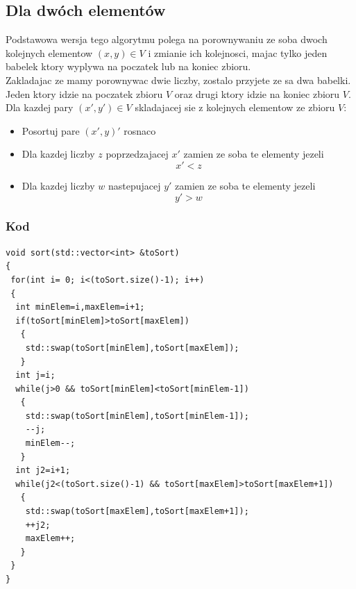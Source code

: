 \subsection{Dla dwóch elementów}
Podstawowa wersja tego algorytmu polega na porownywaniu ze soba dwoch kolejnych elementow $(x,y) \in V$ i zmianie ich kolejnosci, majac tylko jeden babelek ktory wyplywa na poczatek lub na koniec zbioru. \\
Zakladajac ze mamy porownywac dwie liczby, zostalo przyjete ze sa dwa babelki. Jeden ktory idzie na poczatek zbioru  $V$ oraz drugi ktory idzie na koniec zbioru $V$. \\
Dla kazdej pary $(x',y') \in V$ skladajacej sie z kolejnych elementow ze zbioru $V$:
\begin{itemize} 
\item Posortuj pare $(x',y)'$ rosnaco
\item Dla kazdej liczby $z$ poprzedzajacej $x'$ zamien ze soba te elementy jezeli\begin{equation*}x' < z\end{equation*} 
\item  Dla kazdej liczby $w$ nastepujacej $y'$ zamien ze soba te elementy jezeli \begin{equation*}y'>w\end{equation*}
 \end{itemize}  
\subsubsection*{Kod}

\begin{lstlisting}
void sort(std::vector<int> &toSort)
{
 for(int i= 0; i<(toSort.size()-1); i++)
 {
  int minElem=i,maxElem=i+1;
  if(toSort[minElem]>toSort[maxElem])
   {
    std::swap(toSort[minElem],toSort[maxElem]);
   }
  int j=i;
  while(j>0 && toSort[minElem]<toSort[minElem-1])
   {
    std::swap(toSort[minElem],toSort[minElem-1]);
    --j;
    minElem--;
   }
  int j2=i+1;
  while(j2<(toSort.size()-1) && toSort[maxElem]>toSort[maxElem+1])
   {
    std::swap(toSort[maxElem],toSort[maxElem+1]);
    ++j2;
    maxElem++;
   } 
 }
}
\end{lstlisting}
